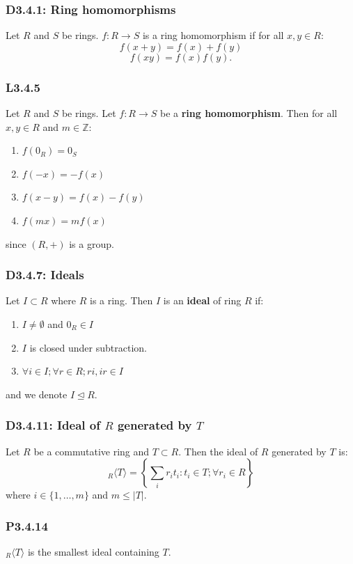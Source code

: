 \documentclass{article}
\begin{document}
\begin{multicols*}{3}
\subsubsection*{D3.4.1: Ring homomorphisms}
Let $R$ and $S$ be rings. $f:R\rightarrow S$ is a ring
homomorphism if for all $x,y\in R$:
$$f(x+y)=f(x)+f(y)$$
$$f(xy)=f(x)f(y).$$

\subsubsection*{L3.4.5}
Let $R$ and $S$ be rings. Let $f:R\rightarrow S$ be a
\textbf{ring homomorphism}.
Then for all $x,y\in R$ and $m\in\mathbb{Z}$:
\begin{enumerate}
    \item $f(0_R)=0_S$
    \item $f(-x)=-f(x)$
    \item $f(x-y)=f(x)-f(y)$
    \item $f(mx)=mf(x)$
\end{enumerate}
since $(R,+)$ is a group.

\subsubsection*{D3.4.7: Ideals}
Let $I\subset R$ where $R$ is a ring. Then
$I$ is an \textbf{ideal} of ring $R$ if:
\begin{enumerate}
    \item $I\neq\emptyset$ and $0_R\in I$
    \item $I$ is closed under subtraction.
    \item $\forall i\in I;\forall r\in R;
    ri,ir\in I$
\end{enumerate}
and we denote $I\trianglelefteq R$.

\subsubsection*{D3.4.11: Ideal of $R$ generated by $T$}
Let $R$ be a commutative ring and $T\subset R$.
Then the ideal of $R$ generated by $T$ is:
$${}_R\langle T\rangle=\left\{\sum_i r_i t_i
:t_i\in T;\forall r_i\in R\right\}$$
where $i\in\{1,\dots,m\}$ and $m\leq|T|$.

\subsubsection*{P3.4.14}
${}_R\langle T\rangle$ is the smallest ideal
containing $T$.


\end{multicols*}
\end{document}
